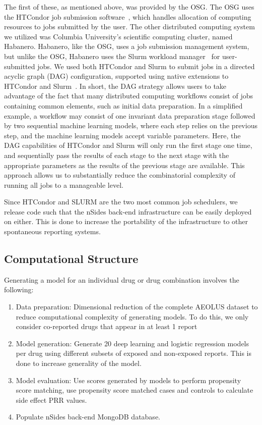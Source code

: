 \documentclass{ws-procs11x85}
\begin{document}
The first of these, as mentioned above, was provided by the OSG. The
OSG uses the HTCondor job submission
software~\cite{beowulfbook-condor}, which handles allocation of
computing resources to jobs submitted by the user. The other
distributed computing system we utilized was Columbia University's
scientific computing cluster, named Habanero. Habanero, like the OSG,
uses a job submission management system, but unlike the OSG, Habanero
uses the Slurm workload manager~\cite{slurm} for user-submitted
jobs. We used both HTCondor and Slurm to submit jobs in a directed
acyclic graph (DAG) configuration, supported using native extensions
to HTCondor and Slurm~\cite{dagman}. In short, the DAG strategy allows
users to take advantage of the fact that many distributed computing
workflows consist of jobs containing common elements, such as initial
data preparation. In a simplified example, a workflow may consist of
one invariant data preparation stage followed by two sequential
machine learning models, where each step relies on the previous step,
and the machine learning models accept variable parameters. Here, the
DAG capabilities of HTCondor and Slurm will only run the first stage
one time, and sequentially pass the results of each stage to the next
stage with the appropriate parameters as the results of the previous
stage are available. This approach allows us to substantially reduce
the combinatorial complexity of running all jobs to a manageable
level.

Since HTCondor and SLURM are the two most common job schedulers, we
release code such that the nSides back-end infrastructure can be
easily deployed on either. This is done to increase the portability of
the infrastructure to other spontaneous reporting systems.

\subsection{Computational Structure}
Generating a model for an individual drug or drug combination involves the following:

\begin{enumerate}
\item Data preparation: Dimensional reduction of the complete AEOLUS dataset to reduce computational complexity of generating models. To do this, we only consider co-reported drugs that appear in at least 1 report
\item Model generation: Generate 20 deep learning and logistic regression models per drug using different subsets of exposed and non-exposed reports. This is done to increase generality of the model.
\item Model evaluation: Use scores generated by models to perform propensity score matching, use propensity score matched cases and controls to calculate side effect PRR values.
\item Populate nSides back-end MongoDB database.
\end{enumerate}
\end{document}
